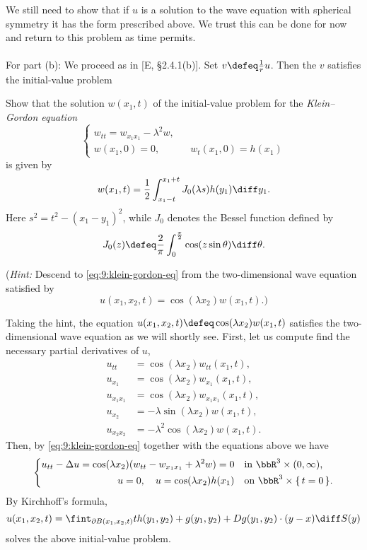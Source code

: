\begin{solution}
  We still need to show that if \(u\) is a solution to the wave equation
  with spherical symmetry it has the form prescribed above. We trust this
  can be done for now and return to this problem as time permits.
  \\\\
  For part (b): We proceed as in [E, \S 2.4.1(b)]. Set
  \(v\defeq \frac{1}{r}u\). Then the \(v\) satisfies the initial-value
  problem
\end{solution}
\newpage

\begin{problem}
  Show that the solution \(w(x_1,t)\) of the initial-value problem for the
  \emph{Klein--Gordon equation}
  \begin{equation}
    \label{eq:9:klein-gordon-eq}
    \left\{
      \begin{aligned}
        w_{tt}=w_{x_1x_1}-\lambda^2w,\\
        w(x_1,0)=0,&&w_t(x_1,0)=h(x_1)
      \end{aligned}
    \right.
  \end{equation}
  is given by
  \[
    w(x_1,t)=\frac{1}{2}\int_{x_1-t}^{x_1+t}J_0(\lambda s) h(y_1)\diff y_1.
  \]
  Here \(s^2=t^2-(x_1-y_1)^2\), while \(J_0\) denotes the Bessel function
  defined by
  \[
    J_0(z)\defeq \frac{2}{\pi}\int_0^{\frac{\pi}{2}}\cos(z\sin\theta)\diff\theta.
  \]

  \noindent (\emph{Hint:} Descend to \eqref{eq:9:klein-gordon-eq} from the
  two-dimensional wave equation satisfied by
  \[
    u(x_1,x_2,t)=\cos(\lambda x_2)w(x_1,t).\text{)}
  \]
\end{problem}
\begin{solution}
  Taking the hint, the equation \(u(x_1,x_2,t)\defeq\cos(\lambda
  x_2)w(x_1,t)\) satisfies the two-dimensional wave equation as we will
  shortly see. First, let us compute find the necessary partial derivatives
  of \(u\),
  \begin{align*}
    u_{tt}&=\cos(\lambda x_2)w_{tt}(x_1,t),\\
    u_{x_1}&=\cos(\lambda x_2)w_{x_1}(x_1,t),\\
    u_{x_1x_1}&=\cos(\lambda x_2)w_{x_1x_1}(x_1,t),\\
    u_{x_2}&=-\lambda\sin(\lambda x_2)w(x_1,t),\\
    u_{x_2x_2}&=-\lambda^2\cos(\lambda x_2)w(x_1,t).
  \end{align*}
  Then, by \eqref{eq:9:klein-gordon-eq} together with the equations above
  we have
  \[
    \left\{
      \begin{aligned}
        u_{tt}-\Delta u=\cos(\lambda x_2)(w_{tt}-w_{x_1x_1}+\lambda^2 w)=0
        &&&\text{in \(\bbR^3\times(0,\infty)\),}\\
        u=0,\quad u=\cos(\lambda x_2)h(x_1)&&&\text{on
          \(\bbR^3\times\{\,t=0\,\}\).}
      \end{aligned}
    \right.
  \]
  By Kirchhoff's formula,
  \[
    u(x_1,x_2,t)=\fint_{\partial
      B(x_1,x_2,t)}th(y_1,y_2)+g(y_1,y_2)+Dg(y_1,y_2)\cdot(y-x)\diff S(y)
  \]
  solves the above initial-value problem.
\end{solution}
\newpage

